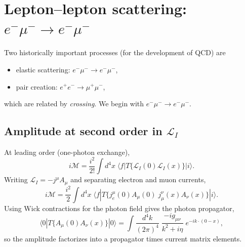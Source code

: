 \section{Lepton--lepton scattering: $e^-\mu^- \to e^-\mu^-$}
Two historically important processes (for the development of QCD) are
\begin{itemize}
  \item elastic scattering: $e^-\mu^- \to e^-\mu^-$,
  \item pair creation: $e^+e^- \to \mu^+\mu^-$,
\end{itemize}
which are related by \emph{crossing}. We begin with $e^-\mu^- \to e^-\mu^-$.

\subsection{Amplitude at second order in $\mathcal{L}_I$}
At leading order (one-photon exchange),
\begin{equation}
i\mathcal{M}
=
\frac{i^2}{2!}\int d^4x\;
\langle f|T\{\mathcal{L}_I(0)\mathcal{L}_I(x)\}|i\rangle.
\end{equation}
Writing $\mathcal{L}_I=-j^\mu A_\mu$ and separating electron and muon currents,
\begin{equation}
i\mathcal{M}
=
\frac{i^2}{2}\int d^4x\;
\langle f|T\{j_e^\mu(0)A_\mu(0)\; j_\mu^\nu(x)A_\nu(x)\}|i\rangle.
\end{equation}
Using Wick contractions for the photon field gives the photon propagator,
\begin{equation}
\langle 0|T\{A_\mu(0)A_\nu(x)\}|0\rangle
=
\int\frac{d^4k}{(2\pi)^4}\;
\frac{-i g_{\mu\nu}}{k^2+i\eta}\;e^{-ik\cdot(0-x)},
\end{equation}
so the amplitude factorizes into a propagator times current matrix elements.

